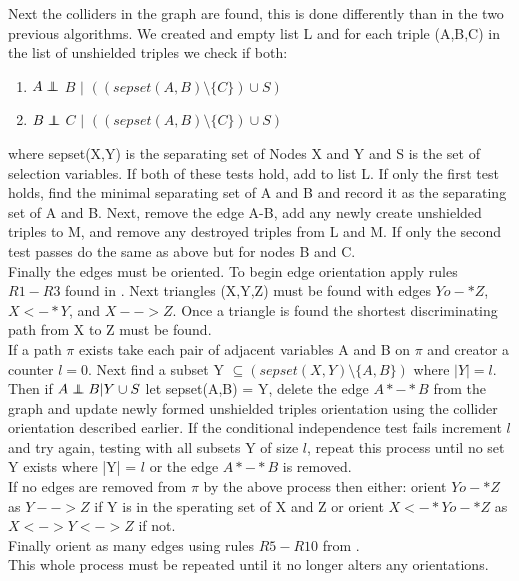 \documentclass{article}
\newcommand\independent{\protect\mathpalette{\protect\independenT}{\perp}}
\def\independenT#1#2{\mathrel{\rlap{$#1#2$}\mkern2mu{#1#2}}}
\begin{document}
Next the colliders in the graph are found, this is done differently than in the two previous algorithms. We created and empty list L and for each triple (A,B,C) in the list of unshielded triples we check if both:
\\

\begin{enumerate}[i]
	\item $A \independent$ $B$ $|$ $((sepset(A,B) \setminus \{C\})\cup S)$
	\item $B \independent$ $C$ $|$ $((sepset(A,B) \setminus \{C\})\cup S)$\end{enumerate}
where sepset(X,Y) is the separating set of Nodes X and Y and S is the set of selection variables. If both of these tests hold, add to list L. If only the first test holds, find the minimal separating set of A and B and record it as the separating set of A and B. Next, remove the edge A-B, add any newly create unshielded triples to M, and remove any destroyed triples from L and M. If only the second test passes do the same as above but for nodes B and C.
\\

Finally the edges must be oriented. To begin edge orientation apply rules $R1-R3$ found in \cite{ZHANG20081873}. Next triangles (X,Y,Z) must be found with edges $Yo-*Z$, $X<-*Y$, and $X-->Z$. Once a triangle is found the shortest discriminating path from X to Z must be found.
\\

If a path $\pi$ exists take each pair of adjacent variables A and B on $\pi$ and creator a counter $l = 0$. Next find  a subset Y  $\subseteq (sepset(X,Y) \setminus \{A,B\})$ where $|Y| = l$. Then if $A \independent B | Y \cup S$ let sepset(A,B) = Y, delete the edge $A*-*B$ from the graph and update newly formed unshielded triples orientation using the collider orientation described earlier. If the conditional independence test fails increment $l$ and try again, testing with all subsets Y of size $l$, repeat this process until no set Y exists where |Y| = $l$ or the edge $A*-*B$ is removed. 
\\

If no edges are removed from $\pi$ by the above process then either: orient $Yo-*Z$ as $Y-->Z$ if Y is in the sperating set of X and Z or orient $X<-*Yo-*Z$ as $X<->Y<->Z$ if not.
\\

Finally orient as many edges using rules $R5-R10$ from \cite{ZHANG20081873}.
\\

This whole process must be repeated until it no longer alters any orientations.\cite{colombo2012learning}

{}

\end{document}
